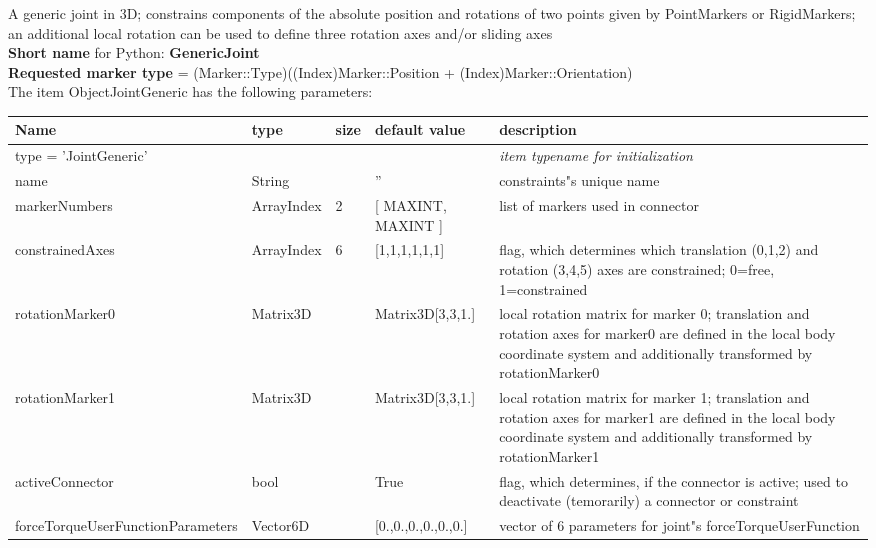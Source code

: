 A generic joint in 3D; constrains components of the absolute position and rotations of two points given by PointMarkers or RigidMarkers; an additional local rotation can be used to define three rotation axes and/or sliding axes
 \\
{\bf Short name} for Python: {\bf GenericJoint}
 \\  {\bf Requested marker type} = (Marker::Type)((Index)Marker::Position + (Index)Marker::Orientation) \\ 
The item ObjectJointGeneric has the following parameters:
\begin{center}
  \footnotesize
  \begin{longtable}{| p{4.5cm} | p{2.5cm} | p{0.5cm} | p{2.5cm} | p{6cm} |}
    \hline
    \bf Name & \bf type & \bf size & \bf default value & \bf description \\ \hline
    \multicolumn{4}{l}{\parbox{10cm}{type = 'JointGeneric'}} & \multicolumn{1}{l}{\parbox{6cm}{\it item typename for initialization}}\\ \hline
    name &     String &      &     '' &     constraints"s unique name\\ \hline
    markerNumbers &     ArrayIndex &     2 &     [ MAXINT, MAXINT ] &     list of markers used in connector\\ \hline
    constrainedAxes &     ArrayIndex &     6 &     [1,1,1,1,1,1] &     flag, which determines which translation (0,1,2) and rotation (3,4,5) axes are constrained; 0=free, 1=constrained\\ \hline
    rotationMarker0 &     Matrix3D &      &     Matrix3D[3,3,1.] &     local rotation matrix for marker 0; translation and rotation axes for marker0 are defined in the local body coordinate system and additionally transformed by rotationMarker0\\ \hline
    rotationMarker1 &     Matrix3D &      &     Matrix3D[3,3,1.] &     local rotation matrix for marker 1; translation and rotation axes for marker1 are defined in the local body coordinate system and additionally transformed by rotationMarker1\\ \hline
    activeConnector &     bool &      &     True &     flag, which determines, if the connector is active; used to deactivate (temorarily) a connector or constraint\\ \hline
    forceTorqueUserFunctionParameters &     Vector6D &      &     [0.,0.,0.,0.,0.,0.] &     vector of 6 parameters for joint"s forceTorqueUserFunction\\ \hline

\end{longtable}
\end{center}

